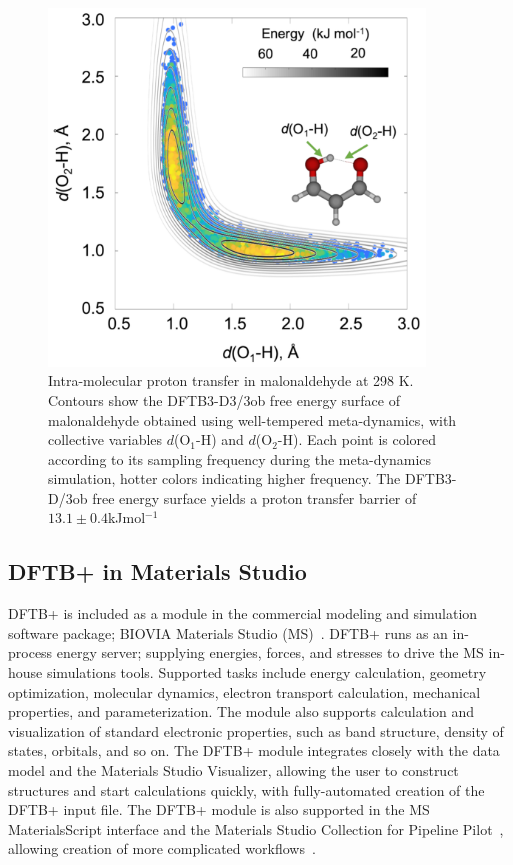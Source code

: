 \documentclass[reprint,onecolumn,superscriptaddress]{revtex4-1}
\newcommand{\dftbp}{DFTB+}
\begin{document}
\begin{figure}[htbp]
  \centering
  \includegraphics[width=10cm]{mtdfigure.png}
  \caption{Intra-molecular proton transfer in malonaldehyde at 298 K. Contours
    show the DFTB3-D3/3ob free energy surface of malonaldehyde obtained using
    well-tempered meta-dynamics, with collective variables $d$(O$_{1}$-H) and
    $d$(O$_{2}$-H). Each point is colored according to its sampling frequency
    during the meta-dynamics simulation, hotter colors indicating higher
    frequency.  The DFTB3-D/3ob free energy surface yields a proton transfer
    barrier of $13.1 \pm 0.4$\;kJ\;mol$^{-1}$}
  \label{fig:mtd}
\end{figure}

\subsection{\dftbp{} in Materials Studio}

\dftbp{} is included as a module in the commercial modeling and simulation
software package; BIOVIA Materials Studio (MS)~\cite{BIOVIA-MS}. \dftbp{} runs as
an in-process energy server; supplying energies, forces, and stresses to drive
the MS in-house simulations tools. Supported tasks include energy calculation,
geometry optimization, molecular dynamics, electron transport calculation,
mechanical properties, and parameterization. The module also supports
calculation and visualization of standard electronic properties, such as band
structure, density of states, orbitals, and so on. The \dftbp{} module
integrates closely with the data model and the Materials Studio Visualizer,
allowing the user to construct structures and start calculations quickly, with
fully-automated creation of the \dftbp{} input file.  The \dftbp{} module is
also supported in the MS MaterialsScript interface and the Materials Studio
Collection for Pipeline Pilot~\cite{BIOVIA-MSC}, allowing creation of more
complicated workflows~\cite{C7RA04120A,C6CP03987A}.
\end{document}

